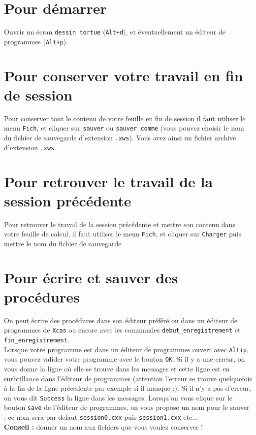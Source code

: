 \documentclass[a4paper,11pt]{book}
\begin{document}
\section{Pour d\'emarrer}
Ouvrir un \'ecran {\tt dessin tortue} ({\tt Alt+d}), et \'eventuellement un 
\'editeur de programmes ({\tt Alt+p}).

\section{Pour conserver votre travail en fin de session}
Pour conserver tout le contenu de votre feuille en fin de session il faut
utiliser le menu {\tt Fich}, et cliquer sur {\tt sauver} ou 
{\tt sauver comme} (vous pouvez choisir le nom du fichier de sauvegarde
d'extension {\tt .xws}). 
Vous avez ainsi un fichier archive d'extension {\tt .xws}.

\section{Pour retrouver le travail de la session pr\'ec\'edente}
Pour retrouver le travail de la session pr\'ec\'edente et mettre son contenu 
dans votre feuille de calcul, il faut utiliser le menu {\tt Fich}, et cliquer 
sur {\tt Charger} puis mettre le nom du fichier de sauvegarde

\section{Pour \'ecrire et sauver des proc\'edures}
On peut \'ecrire des proc\'edures dans son \'editeur pr\'ef\'er\'e ou dans 
un \'editeur de programmes de {\tt Xcas} ou encore avec les commandes 
{\tt debut\_enregistrement} et {\tt fin\_enregistrement}.\\
Lorsque votre programme est dans un \'editeur de programmes ouvert avec 
{\tt Alt+p}, vous pouvez valider votre programme avec le 
bouton {\tt OK}. Si il y a une erreur, on vous donne la ligne o\`u elle se 
trouve dans les messages et cette ligne est en surbrillance dans l'\'editeur 
de programmes (attention l'erreur se trouve quelquefois \`a la fin de la ligne 
pr\'ec\'edente par exemple si il manque ;). Si il n'y a pas d'erreur, on vous 
dit {\tt Success} la ligne dans les messages. Lorsqu'on vous clique sur
le bouton {\tt save} de l'\'editeur de programmes, on vous propose un 
nom pour le sauver : ce nom sera par defaut  {\tt session0.cxx} puis 
{\tt session1.cxx} etc...\\
{\bf Conseil :}  donner un nom aux fichiers que vous voulez conserver !
\end{document}

